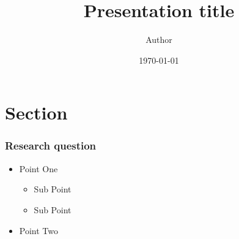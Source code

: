 \documentclass{beamer}
\title{Presentation title}
\author{Author}
\institute{Affiliation}
\date{\today}
\begin{document}
\frame{\titlepage}

\section{Section}

\begin{frame}
\frametitle{Research question}
\begin{itemize}
	\item Point One 
	\begin{itemize}
		\item Sub Point
		\item Sub Point  
	\end{itemize}
 	\item Point Two
\end{itemize}
\end{frame}
\end{document}
